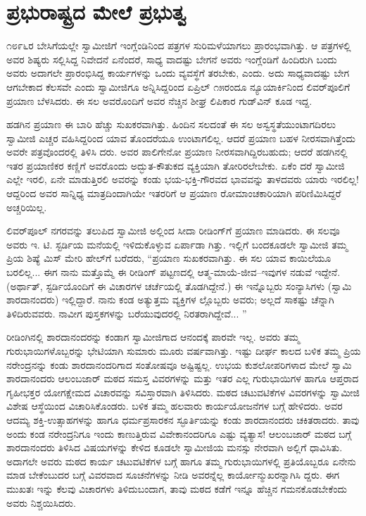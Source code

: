 
\chapter{ಪ್ರಭುರಾಷ್ಟ್ರದ ಮೇಲೆ ಪ್ರಭುತ್ವ}

\noindent

೧೮೯೬ರ ಬೇಸಿಗೆಯಲ್ಲೇ ಸ್ವಾಮೀಜಿಗೆ ಇಂಗ್ಲೆಂಡಿನಿಂದ ಪತ್ರಗಳ ಸುರಿಮಳೆಯಾಗಲು ಪ್ರಾರಂಭವಾಗಿತ್ತು. ಆ ಪತ್ರಗಳಲ್ಲಿ ಅವರ ಶಿಷ್ಯರು ಸಲ್ಲಿಸಿದ್ದ ನಿವೇದನೆ ಏನೆಂದರೆ, ಸಾಧ್ಯ ವಾದಷ್ಟು ಬೇಗನೆ ಅವರು ಇಂಗ್ಲೆಂಡಿಗೆ ಹಿಂದಿರುಗಿ ಬಂದು ಅವರು ಅದಾಗಲೇ ಪ್ರಾರಂಭಿಸಿದ್ದ ಕಾರ್ಯಗಳನ್ನು ಒಂದು ವ್ಯವಸ್ಥೆಗೆ ತರಬೇಕು, ಎಂದು. ಅದು ಸಾಧ್ಯವಾದಷ್ಟು ಬೇಗ ಆಗಬೇಕಾದ ಕೆಲಸವೇ ಎಂದು ಸ್ವಾಮೀಜಿಗೂ ಅನ್ನಿಸಿದ್ದರಿಂದ ಏಪ್ರಿಲ್ ೧೫ರಂದೂ ನ್ಯೂಯಾರ್ಕಿನಿಂದ ಲಿವರ್​ಪೂಲಿಗೆ ಪ್ರಯಾಣ ಬೆಳಸಿದರು. ಈ ಸಲ ಅವರೊಂದಿಗೆ ಅವರ ನೆಚ್ಚಿನ ಶೀಘ್ರ ಲಿಪಿಕಾರ ಗುಡ್​ವಿನ್ ಕೂಡ ಇದ್ದ.

ಹಡಗಿನ ಪ್ರಯಾಣ ಈ ಬಾರಿ ಹೆಚ್ಚು ಸುಖಕರವಾಗಿತ್ತು. ಹಿಂದಿನ ಸಲದಂತೆ ಈ ಸಲ ಅಸ್ವಸ್ಥತೆಯುಂಟಾಗದಿರಲು ಸ್ವಾಮೀಜಿ ಎಚ್ಚರ ವಹಿಸಿದ್ದರಿಂದ ಯಾವ ತೊಂದರೆಯೂ ಉಂಟಾಗಲಿಲ್ಲ. ಆದರೆ ಪ್ರಯಾಣ ಬಹಳ ನೀರಸವಾಗಿತ್ತೆಂದು ಅವರೇ ಪತ್ರವೊಂದರಲ್ಲಿ ತಿಳಿಸಿ ದರು. ಅವರ ಪಾಲಿಗೇನೋ ಪ್ರಯಾಣ ನೀರಸವಾಗಿದ್ದಿರಬಹುದು; ಆದರೆ ಹಡಗಿನಲ್ಲಿ ಇತರ ಪ್ರಯಾಣಿಕರ ಕಣ್ಣಿಗೆ ಅವರೊಂದು ಅದ್ಭುತ-ಕೌತುಕದ ವ್ಯಕ್ತಿಯಾಗಿ ತೋರಿರಲೇಬೇಕು. ಏಕೆಂ ದರೆ ಸ್ವಾಮೀಜಿ ಎಲ್ಲೇ ಇರಲಿ, ಏನೇ ಮಾಡುತ್ತಿರಲಿ ಅವರನ್ನು ಕಂಡು ಭಯ-ಭಕ್ತಿ-ಗೌರವದ ಭಾವವನ್ನು ತಾಳದವರು ಯಾರು ಇರಲಿಲ್ಲ! ಆದ್ದರಿಂದ ಅವರ ಸಾನ್ನಿಧ್ಯ ಮಾತ್ರದಿಂದಾಗಿಯೇ ಇತರರಿಗೆ ಆ ಪ್ರಯಾಣ ರೋಮಾಂಚಕಾರಿಯಾಗಿ ಪರಿಣಿಮಿಸಿದ್ದರೆ ಅಚ್ಚರಿಯಿಲ್ಲ.

ಲಿವರ್​ಪೂಲ್ ನಗರವನ್ನು ತಲುಪಿದ ಸ್ವಾಮೀಜಿ ಅಲ್ಲಿಂದ ಸೀದಾ ರೀಡಿಂಗ್​ಗೆ ಪ್ರಯಾಣ ಮಾಡಿದರು. ಈ ಸಲವೂ ಅವರು ಇ. ಟಿ. ಸ್ಟರ್ಡಿಯ ಮನೆಯಲ್ಲಿ ಇಳಿದುಕೊಳ್ಳುವ ಏರ್ಪಾಡಾ ಗಿತ್ತು. ಇಲ್ಲಿಗೆ ಬಂದಕೂಡಲೇ ಸ್ವಾಮೀಜಿ ತಮ್ಮ ಪ್ರಿಯ ಶಿಷ್ಯೆ ಮಿಸ್ ಮೇರಿ ಹೇಲ್​ಗೆ ಬರೆದರು, “ಪ್ರಯಾಣ ಸುಖಕರವಾಗಿತ್ತು. ಈ ಸಲ ಯಾವ ಕಾಯಿಲೆಯೂ ಬರಲಿಲ್ಲ... ಈಗ ನಾನು ಮತ್ತೊಮ್ಮೆ ಈ ರೀಡಿಂಗ್ ಪಟ್ಟಣದಲ್ಲಿ ಆತ್ಮ-ಮಾಯೆ-ಜೀವ–ಇವುಗಳ ನಡುವೆ ಇದ್ದೇನೆ. (ಅರ್ಥಾತ್, ಸ್ಟರ್ಡಿಯೊಂದಿಗೆ ಈ ವಿಚಾರಗಳ ಚರ್ಚೆಯಲ್ಲಿ ತೊಡಗಿದ್ದೇನೆ.) ಈ ಇನ್ನೊಬ್ಬರು ಸಂನ್ಯಾಸಿಗಳು (ಸ್ವಾಮಿ ಶಾರದಾನಂದರು) ಇಲ್ಲಿದ್ದಾರೆ. ನಾನು ಕಂಡ ಅತ್ಯುತ್ತಮ ವ್ಯಕ್ತಿಗಳ ಲ್ಲೊಬ್ಬರು ಅವರು; ಅಲ್ಲದೆ ಸಾಕಷ್ಟು ಚೆನ್ನಾಗಿ ತಿಳಿದಿರುವವರು. ನಾವೀಗ ಪುಸ್ತಕಗಳನ್ನು ಬರೆಯುವುದರಲ್ಲಿ ನಿರತರಾಗಿದ್ದೇವೆ... ”

ರೀಡಿಂಗಿನಲ್ಲಿ ಶಾರದಾನಂದರನ್ನು ಕಂಡಾಗ ಸ್ವಾಮೀಜಿಗಾದ ಆನಂದಕ್ಕೆ ಪಾರವೇ ಇಲ್ಲ. ಅವರು ತಮ್ಮ ಗುರುಭಾಯಿಗಳೊಬ್ಬರನ್ನು ಭೇಟಿಯಾಗಿ ಸುಮಾರು ಮೂರು ವರ್ಷವಾಗಿತ್ತು. ಇಷ್ಟು ದೀರ್ಘ ಕಾಲದ ಬಳಿಕ ತಮ್ಮ ಪ್ರಿಯ ನರೇಂದ್ರನನ್ನು ಕಂಡು ಶಾರದಾನಂದರಿಗಾದ ಸಂತೋಷವೂ ಅಷ್ಟಿಷ್ಟಲ್ಲ. ಉಭಯ ಕುಶಲೋಪರಿಗಳಾದ ಮೇಲೆ ಸ್ವಾಮಿ ಶಾರದಾನಂದರು ಆಲಂಬಜಾರ್ ಮಠದ ಸಮಸ್ತ ವಿವರಗಳನ್ನು ಮತ್ತು ಇತರ ಎಲ್ಲ ಗುರುಭಾಯಿಗಳ ಹಾಗೂ ಆಪ್ತರಾದ ಗೃಹೀಭಕ್ತರ ಯೋಗಕ್ಷೇಮದ ವಿಚಾರವನ್ನು ಸವಿಸ್ತಾರವಾಗಿ ತಿಳಿಸಿದರು. ಮಠದ ಚಟುವಟಿಕೆಗಳ ವಿವರಗಳನ್ನು ಸ್ವಾಮೀಜಿ ವಿಶೇಷ ಆಸ್ಥೆಯಿಂದ ವಿಚಾರಿಸಿಕೊಂಡರು. ಬಳಿಕ ತಮ್ಮ ಹಲವಾರು ಕಾರ್ಯಯೋಜನೆಗಳ ಬಗ್ಗೆ ಹೇಳಿದರು. ಅವರ ಆದಮ್ಯ ಶಕ್ತಿ-ಉತ್ಸಾಹಗಳನ್ನು ಹಾಗೂ ಧರ್ಮಪ್ರಸಾರಕನ ಸ್ಫೂರ್ತಿಯನ್ನು ಕಂಡು ಶಾರದಾನಂದರು ಚಕಿತರಾದರು. ತಾವು ಅಂದು ಕಂಡ ನರೇಂದ್ರನಿಗೂ ಇಂದು ಕಾಣುತ್ತಿರುವ ವಿವೇಕಾನಂದರಿಗೂ ಎಷ್ಟು ವ್ಯತ್ಯಾಸ! ಆಲಂಬಜಾರ್ ಮಠದ ಬಗ್ಗೆ ಶಾರದಾನಂದರು ತಿಳಿಸಿದ ವಿಷಯಗಳನ್ನು ಕೇಳಿದ ಕೂಡಲೇ ಸ್ವಾಮೀಜಿಯ ಮನಸ್ಸು ನೇರವಾಗಿ ಅಲ್ಲಿಗೆ ಧಾವಿಸಿತು. ಅದಾಗಲೇ ಅವರು ಮಠದ ಕಾರ್ಯ ಚಟುವಟಿಕೆಗಳ ಬಗ್ಗೆ ಹಾಗೂ ತಮ್ಮ ಗುರುಭಾಯಿಗಳಲ್ಲಿ ಪ್ರತಿಯೊಬ್ಬರೂ ಏನೇನು ಮಾಡ ಬೇಕೆಂಬುದರ ಬಗ್ಗೆ ವಿವರವಾದ ಸೂಚನೆಗಳನ್ನು ನೀಡಿ ಅವರನ್ನೆಲ್ಲ ಕಾರ್ಯೋನ್ಮುಖರನ್ನಾಗಿಸಿ ದ್ದರು. ಈಗ ಮುಖತಃ ಇನ್ನು ಕೆಲವು ವಿಚಾರಗಳು ತಿಳಿದುಬಂದಾಗ, ತಾವು ಮಠದ ಕಡೆಗೆ ಇನ್ನೂ ಹೆಚ್ಚಿನ ಗಮನಕೊಡಬೇಕೆಂದು ಅವರು ನಿಶ್ಚಯಿಸಿದರು.

